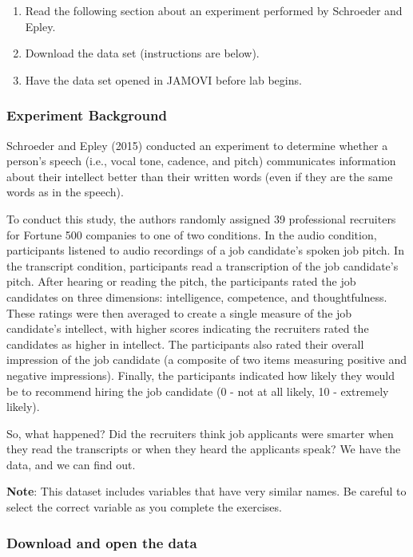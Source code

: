 \documentclass[
]{book}
\providecommand{\tightlist}{%
  \setlength{\itemsep}{0pt}\setlength{\parskip}{0pt}}
\begin{document}
\begin{enumerate}
\def\labelenumi{\arabic{enumi}.}
\tightlist
\item
  Read the following section about an experiment performed by Schroeder and Epley.
\item
  Download the data set (instructions are below).
\item
  Have the data set opened in JAMOVI before lab begins.
\end{enumerate}

\hypertarget{experiment-background-2}{%
\subsubsection{Experiment Background}\label{experiment-background-2}}

Schroeder and Epley (2015) conducted an experiment to determine whether a person's speech (i.e., vocal tone, cadence, and pitch) communicates information about their intellect better than their written words (even if they are the same words as in the speech).

To conduct this study, the authors randomly assigned 39 professional recruiters for Fortune 500 companies to one of two conditions. In the audio condition, participants listened to audio recordings of a job candidate's spoken job pitch. In the transcript condition, participants read a transcription of the job candidate's pitch. After hearing or reading the pitch, the participants rated the job candidates on three dimensions: intelligence, competence, and thoughtfulness. These ratings were then averaged to create a single measure of the job candidate's intellect, with higher scores indicating the recruiters rated the candidates as higher in intellect. The participants also rated their overall impression of the job candidate (a composite of two items measuring positive and negative impressions). Finally, the participants indicated how likely they would be to recommend hiring the job candidate (0 - not at all likely, 10 - extremely likely).

So, what happened? Did the recruiters think job applicants were smarter when they read the transcripts or when they heard the applicants speak? We have the data, and we can find out.

\textbf{Note}: This dataset includes variables that have very similar names. Be careful to select the correct variable as you complete the exercises.

\hypertarget{download-and-open-the-data}{%
\subsubsection{Download and open the data}\label{download-and-open-the-data}}
\end{document}
